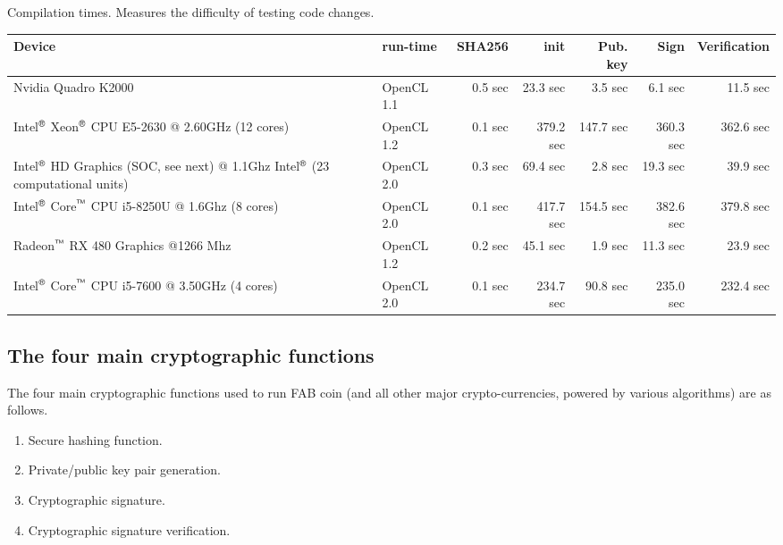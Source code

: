 \documentclass{article}
\begin{document}
Compilation times. Measures the difficulty of testing code changes.

\noindent\begin{tabular}{|p{5cm}|l|r||r|r|r|r|}\hline
Device & run-time & SHA256 & init& Pub. key & Sign & Verification\\\hline
Nvidia Quadro K2000 & OpenCL 1.1 &0.5 sec& 23.3 sec &3.5 sec &6.1 sec &11.5 sec\\\hline 
Intel${}^{\text{\sffamily\textregistered}}$ Xeon${}^{\text{\sffamily\textregistered}}$ CPU E5-2630 @ 2.60GHz (12 cores)&  OpenCL 1.2&0.1 sec&379.2 sec&147.7 sec&360.3 sec&362.6 sec\\\hline \hline
Intel${}^{\text{\sffamily\textregistered}}$ HD Graphics (SOC, see next) @ 1.1Ghz Intel${}^{\text{\sffamily\textregistered}}$ (23 computational units)& OpenCL 2.0& 0.3 sec &69.4 sec &2.8 sec&19.3 sec   & 39.9 sec	 \\\hline
Intel${}^{\text{\sffamily\textregistered}}$ Core${}^{\text{\sffamily\texttrademark}}$ CPU 
i5-8250U @ 1.6Ghz (8 cores)& OpenCL 2.0&0.1 sec&417.7 sec &154.5 sec &382.6 sec &379.8 sec \\\hline\hline 
Radeon${}^{\text{\sffamily\texttrademark}}$ RX 480 Graphics @1266 Mhz &OpenCL 1.2&0.2 sec  &45.1 sec &1.9 sec&11.3 sec&23.9 sec \\\hline 
Intel${}^{\text{\sffamily\textregistered}}$ Core${}^{\text{\sffamily\texttrademark}}$ CPU i5-7600 @ 3.50GHz (4 cores)&OpenCL 2.0&0.1 sec&234.7 sec&90.8 sec&235.0 sec&232.4 sec \\\hline
\end{tabular}


\subsection{The four main cryptographic functions} \label{sectionFourMainCrypto}
The four main cryptographic functions used to run FAB coin (and all other major crypto-currencies, powered by various algorithms) are as follows.
\begin{enumerate}
\item \label{enumFourMainSHA} Secure hashing function.
\item \label{enumFourMainPrivatePublicKeyGeneration} Private/public key pair generation.
\item \label{enumFourMainCryptoSignature} Cryptographic signature.
\item \label{enumFourMainVerification} Cryptographic signature verification.
\end{enumerate}
\end{document}
